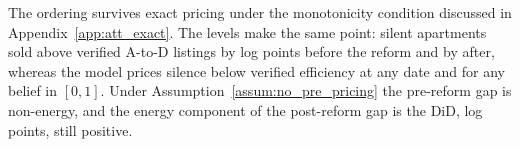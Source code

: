 The ordering survives exact pricing under the monotonicity condition discussed in Appendix~\ref{app:att_exact}. The levels make the same point: silent apartments sold above verified A-to-D listings by \attLevelGapPreApt{} log points before the reform and by \attLevelGapPostApt{} after, whereas the model prices silence below verified efficiency at any date and for any belief in $[0,1]$. Under Assumption~\ref{assum:no_pre_pricing} the pre-reform gap is non-energy, and the energy component of the post-reform gap is the DiD, \attExcessApt{} log points, still positive.